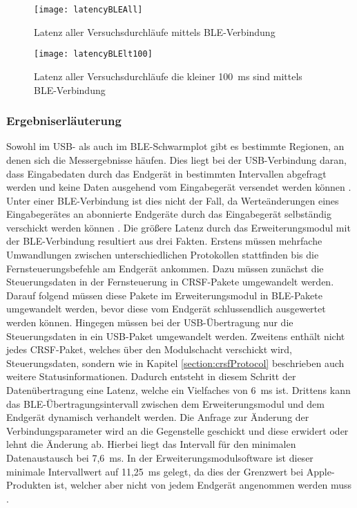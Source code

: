 \begin{figure}[H]
    \centering
    \texttt{[image: latencyBLEAll]}
    \caption{Latenz aller Versuchsdurchläufe mittels \ac{BLE}-Verbindung}
    \label{fig:latencyBLEAll}
\end{figure}

\begin{figure}[H]
    \centering
    \texttt{[image: latencyBLElt100]}
    \caption{Latenz aller Versuchsdurchläufe die kleiner 100~ms sind mittels \ac{BLE}-Verbindung}
    \label{fig:latencyBLElt100}
\end{figure}

\subsubsection{Ergebniserläuterung}
\label{section:resultExplanation}
Sowohl im USB- als auch im \ac{BLE}-Schwarmplot gibt es bestimmte Regionen, an denen sich die Messergebnisse häufen. Dies liegt bei der USB-Verbindung daran, dass Eingabedaten durch das Endgerät in bestimmten Intervallen abgefragt werden und keine Daten ausgehend vom Eingabegerät versendet werden können \cites[S.~48f., S.~277ff.]{usb2Spec}[S.~5]{wimmerLatenzStation}. Unter einer \ac{BLE}-Verbindung ist dies nicht der Fall, da Werteänderungen eines Eingabegerätes an abonnierte Endgeräte durch das Eingabegerät selbständig verschickt werden können \cite[S.~1516]{bluetoothCore}. Die größere Latenz durch das Erweiterungsmodul mit der \ac{BLE}-Verbindung resultiert aus drei Fakten. Erstens müssen mehrfache Umwandlungen zwischen unterschiedlichen Protokollen stattfinden bis die Fernsteuerungsbefehle am Endgerät ankommen. Dazu müssen zunächst die Steuerungsdaten in der Fernsteuerung in CRSF-Pakete umgewandelt werden. Darauf folgend müssen diese Pakete im Erweiterungsmodul in BLE-Pakete umgewandelt werden, bevor diese vom Endgerät schlussendlich ausgewertet werden können. Hingegen müssen bei der USB-Übertragung nur die Steuerungsdaten in ein USB-Paket umgewandelt werden. Zweitens enthält nicht jedes CRSF-Paket, welches über den Modulschacht verschickt wird, Steuerungsdaten, sondern wie in Kapitel \ref{section:crsfProtocol} beschrieben auch weitere Statusinformationen. Dadurch entsteht in diesem Schritt der Datenübertragung eine Latenz, welche ein Vielfaches von 6~ms ist. Drittens kann das \ac{BLE}-Übertragungsintervall zwischen dem Erweiterungsmodul und dem Endgerät dynamisch verhandelt werden. Die Anfrage zur Änderung der Verbindungsparameter wird an die Gegenstelle geschickt und diese erwidert oder lehnt die Änderung ab. Hierbei liegt das Intervall für den minimalen Datenaustausch bei 7,6~ms. In der Erweiterungsmodulsoftware ist dieser minimale Intervallwert auf 11,25~ms gelegt, da dies der Grenzwert bei Apple-Produkten ist, welcher aber nicht von jedem Endgerät angenommen werden muss \cite[S.~188]{appleDesignGuide}. \cite{bleConnectionParameter}

